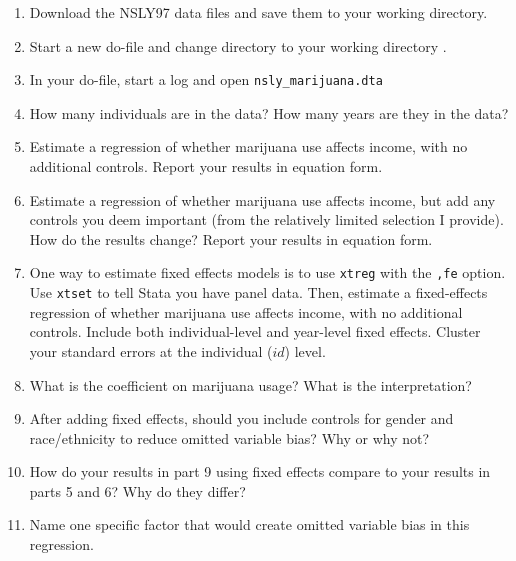 \documentclass[11pt]{article}
\begin{document}
\begin{enumerate}
\def\labelenumi{\arabic{enumi}.}
\item
  Download the NSLY97 data files and save them to your working
  directory.
\item
  Start a new do-file and change directory to your working directory .
\item
  In your do-file, start a log and open \texttt{nsly\_marijuana.dta}
\item
  How many individuals are in the data? How many years are they in the
  data?
\item
  Estimate a regression of whether marijuana use affects income, with no
  additional controls. Report your results in equation form.
\item
  Estimate a regression of whether marijuana use affects income, but add
  any controls you deem important (from the relatively limited selection
  I provide). How do the results change? Report your results in equation
  form.
\item
  One way to estimate fixed effects models is to use \texttt{xtreg} with
  the \texttt{,fe} option. Use \texttt{xtset} to tell Stata you have
  panel data. Then, estimate a fixed-effects regression of whether
  marijuana use affects income, with no additional controls. Include
  both individual-level and year-level fixed effects. Cluster your
  standard errors at the individual (\(id\)) level.
\item
  What is the coefficient on marijuana usage? What is the
  interpretation?
\item
  After adding fixed effects, should you include controls for gender and
  race/ethnicity to reduce omitted variable bias? Why or why not?
\item
  How do your results in part 9 using fixed effects compare to your
  results in parts 5 and 6? Why do they differ?
\item
  Name one specific factor that would create omitted variable bias in
  this regression.
\end{enumerate}
\end{document}
